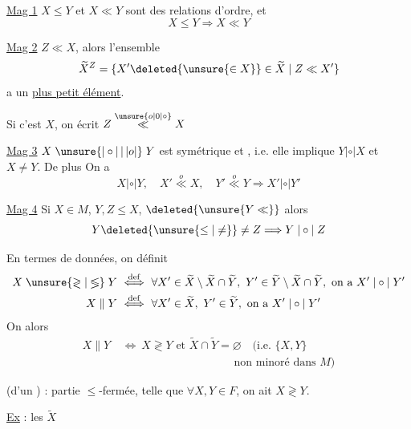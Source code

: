 \uline{Mag 1} $X\leq Y$ et $X\ll Y$ sont des relations d'ordre, et
\[
X\leq Y\Longrightarrow X\ll Y
\]

\uline{Mag 2}  $Z\ll X$, alors l'ensemble
\[
\widetilde{X}^{Z}=\{X'\deleted{\unsure{\in X}}\in\widetilde{X}\mid Z\ll X'\}
\]
a un \uline{plus petit élément}.

Si c'est $X$, on écrit $Z\mathrel{\overset{\unsure{o|0|\circ}}{\ll}}X$

\uline{Mag 3} $X\mathrel{\unsure{|\circ|\,|\,|o|}}Y$ est symétrique et , i.e. elle implique $Y\mathrel{|\circ|}X$ et $X\ne Y$. De plus On a
\[
X\mathrel{|\circ|}Y,\quad X'\mathrel{\overset{o}{\ll}}X,\quad Y'\mathrel{\overset{o}{\ll}}Y\Longrightarrow X'\mathrel{|\circ|}Y'
\]

\uline{Mag 4} Si $X\in M$, $Y,Z\leq X$, $\deleted{\unsure{Y\ll}}$ alors
\[
Y\deleted{\unsure{\leq|\ne}}\ne Z\Longrightarrow Y\mathrel{|\circ|}Z
\]

En termes de  données, on définit
\[
\begin{aligned}
X\mathrel{\unsure{\gtrless|\lessgtr}}Y\ &\overset{\mathrm{def}}{\Longleftrightarrow}\ \forall X'\in\widetilde{X}\setminus\widetilde{X}\cap\widetilde{Y},\ Y'\in\widetilde{Y}\setminus\widetilde{X}\cap\widetilde{Y},\ \text{on a }X'\mathrel{|\circ|}Y'\\
X\mathrel{\|}Y\ &\overset{\mathrm{def}}{\Longleftrightarrow}\ \forall X'\in\widetilde{X},\ Y'\in\widetilde{Y},\ \text{on a }X'\mathrel{|\circ|}Y'
\end{aligned}
\]
On  alors
\[
\begin{aligned}
X\mathrel{\|}Y\ &\Longleftrightarrow\ X\mathrel{\gtrless}Y\text{ et }\widetilde{X}\cap\widetilde{Y}=\varnothing\quad\text{(i.e. }\{X,Y\}\\
&\hspace{10em}\text{non minoré dans }M\text{)}
\end{aligned}
\]

  (d'un ) : partie $\leq$-fermée, telle que $\forall X,Y\in F$, on ait $X\mathrel{\gtrless}Y$.

 \uline{Ex} : les $\widetilde{X}$

